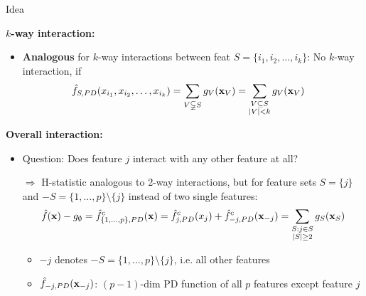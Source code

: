 \documentclass[10pt,compress,t,notes=noshow, xcolor=table]{beamer}
\begin{document}
\begin{frame}{Idea }

\textbf{$k$-way interaction:}
\begin{itemize}
    \item \textbf{Analogous} for $k$-way interactions between feat $S = \{ i_1, i_2, \dots, i_k \}$: No $k$-way interaction, if
    \begin{align*}
        &\hat{f}_{S, PD}( x_{i_1}, x_{i_2}, \dots, x_{i_k} )
        = \sum_{V \subsetneqq S} g_{V}(\mathbf{x}_V)
        = \sum_{\substack{V \subseteq S \\ |V|<k}} g_{V}(\mathbf{x}_V)
    \end{align*}
\end{itemize}
\pause
\textbf{Overall interaction:}
\begin{itemize}
    \item Question: Does feature $j$ interact with any other feature at all?
    \item[$\Rightarrow$] H-statistic analogous to 2-way interactions, but for feature sets $S = \{j\}$ and $-S = \{1, \dots, p\}\setminus \{j\}$ instead of two single features: \\
    \pause
    $$
    \hat{f}(\mathbf{x}) - g_\emptyset
    = \hat{f}^c_{\{1, \dots, p\}, PD}(\mathbf{x})
    = \hat{f}^c_{j, PD}(x_j) +  \hat{f}^c_{-j, PD}(\mathbf{x}_{-j})
    = \sum_{\substack{S: j \in S \\ \mid S \mid \geq 2}} g_S(\mathbf{x}_S)
    $$
    \begin{itemize}
        \item $-j$ denotes $-S = \{1, \dots, p\}\setminus \{j\}$, i.e. all other features
    	\item $\hat{f}_{-j, PD}(\mathbf{x}_{-j})$: $(p-1)$-dim PD function of all $p$ features except feature $j$
    \end{itemize}
\end{itemize}
    
\end{frame}
\end{document}
